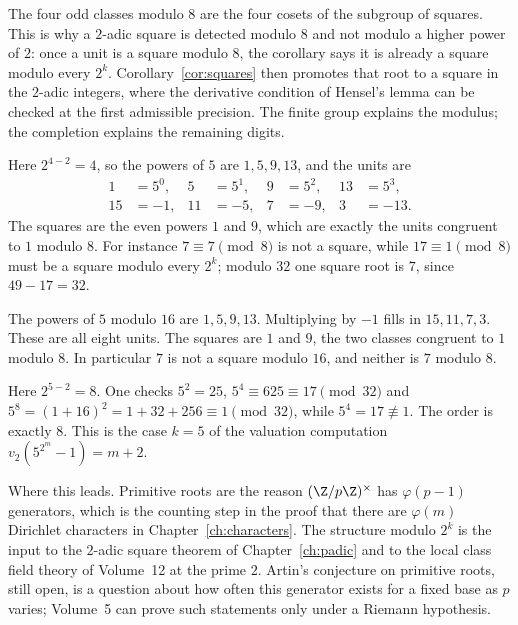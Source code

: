 The four odd classes modulo $8$ are the four cosets of the subgroup of squares. This is why a $2$-adic square is detected modulo $8$ and not modulo a higher power of $2$: once a unit is a square modulo $8$, the corollary says it is already a square modulo every $2^k$. Corollary~\ref{cor:squares} then promotes that root to a square in the $2$-adic integers, where the derivative condition of Hensel's lemma can be checked at the first admissible precision. The finite group explains the modulus; the completion explains the remaining digits.

\begin{examplex}
Here $2^{4-2}=4$, so the powers of $5$ are $1,5,9,13$, and the units are
\[
\begin{aligned}
1&=5^0,&5&=5^1,&9&=5^2,&13&=5^3,\\
15&=-1,&11&=-5,&7&=-9,&3&=-13.
\end{aligned}
\]
The squares are the even powers $1$ and $9$, which are exactly the units congruent to $1$ modulo $8$. For instance $7\equiv7\pmod8$ is not a square, while $17\equiv1\pmod8$ must be a square modulo every $2^k$; modulo $32$ one square root is $7$, since $49-17=32$.
\end{examplex}

\begin{examplex}
The powers of $5$ modulo $16$ are $1,5,9,13$. Multiplying by $-1$ fills in $15,11,7,3$. These are all eight units. The squares are $1$ and $9$, the two classes congruent to $1$ modulo $8$. In particular $7$ is not a square modulo $16$, and neither is $7$ modulo $8$.
\end{examplex}

\begin{examplex}
Here $2^{5-2}=8$. One checks $5^2=25$, $5^4\equiv 625\equiv 17\pmod{32}$ and $5^8=(1+16)^2=1+32+256\equiv 1\pmod{32}$, while $5^4=17\not\equiv 1$. The order is exactly $8$. This is the case $k=5$ of the valuation computation $v_2(5^{2^m}-1)=m+2$.
\end{examplex}

\begin{beauty}
Where this leads. Primitive roots are the reason $(\Z/p\Z)^\times$ has $\varphi(p-1)$ generators, which is the counting step in the proof that there are $\varphi(m)$ Dirichlet characters in Chapter~\ref{ch:characters}. The structure modulo $2^k$ is the input to the $2$-adic square theorem of Chapter~\ref{ch:padic} and to the local class field theory of Volume~12 at the prime $2$. Artin's conjecture on primitive roots, still open, is a question about how often this generator exists for a fixed base as $p$ varies; Volume~5 can prove such statements only under a Riemann hypothesis.
\end{beauty}

